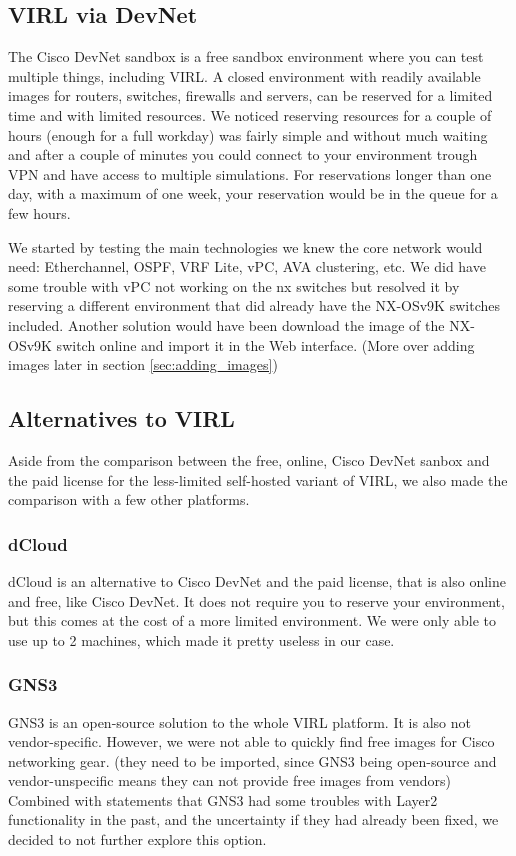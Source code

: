\documentclass{article}
\begin{document}
\subsection{VIRL via DevNet}
The Cisco DevNet sandbox is a free sandbox environment where you can test multiple things, including VIRL.
A closed environment with readily available images for routers, switches, firewalls and servers,
can be reserved for a limited time and with limited resources.
We noticed reserving resources for a couple of hours (enough for a full workday)
was fairly simple and without much waiting
and after a couple of minutes you could connect to your environment trough VPN and have access to multiple simulations.
For reservations longer than one day, with a maximum of one week,
your reservation would be in the queue for a few hours.

We started by testing the main technologies we knew the core network would need:
Etherchannel, OSPF, VRF Lite, vPC, AVA clustering, etc.
We did have some trouble with vPC not working on the nx switches
but resolved it by reserving a different environment that did already have the NX-OSv9K switches included.
Another solution would have been download the image of the NX-OSv9K switch online 
and import it in the Web interface.
(More over adding images later in section \ref{sec:adding_images})

\subsection{Alternatives to VIRL}
Aside from the comparison between the free, online, Cisco DevNet sanbox
and the paid license for the less-limited self-hosted variant of VIRL,
we also made the comparison with a few other platforms.

\subsubsection{dCloud}
dCloud is an alternative to Cisco DevNet and the paid license,
that is also online and free, like Cisco DevNet.
It does not require you to reserve your environment,
but this comes at the cost of a more limited environment.
We were only able to use up to 2 machines, which made it pretty useless in our case.

\subsubsection{GNS3}
GNS3 is an open-source solution to the whole VIRL platform.
It is also not vendor-specific.
However, we were not able to quickly find free images for Cisco networking gear.
(they need to be imported, since GNS3 being open-source and vendor-unspecific means they can not provide free images from vendors)
Combined with statements that GNS3 had some troubles with Layer2 functionality in the past,
and the uncertainty if they had already been fixed,
we decided to not further explore this option.
\end{document}
